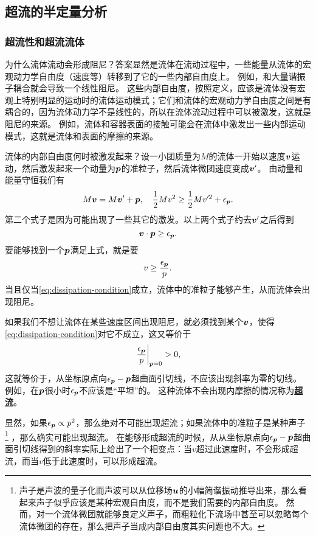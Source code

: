 \documentclass[hyperref, UTF8, a4paper]{ctexart}
\newcommand{\concept}[1]{\underline{\textbf{#1}}}
\begin{document}
\subsection{超流的半定量分析}

\subsubsection{超流性和超流流体}

为什么流体流动会形成阻尼？答案显然是流体在流动过程中，一些能量从流体的宏观动力学自由度（速度等）转移到了它的一些内部自由度上。
例如，和大量谐振子耦合就会导致一个线性阻尼。
这些内部自由度，按照定义，应该是流体没有宏观上特别明显的运动时的流体运动模式；它们和流体的宏观动力学自由度之间是有耦合的，因为流体动力学不是线性的，所以在流体流动过程中可以被激发，这就是阻尼的来源。
例如，流体和容器表面的接触可能会在流体中激发出一些内部运动模式，这就是流体和表面的摩擦的来源。

流体的内部自由度何时被激发起来？设一小团质量为$M$的流体一开始以速度$\vb*{v}$运动，然后激发起来一个动量为$\vb*{p}$的准粒子，然后流体微团速度变成$\vb*{v}'$。
由动量和能量守恒我们有
\[
    M \vb*{v} = M \vb*{v}' + \vb*{p}, \quad \frac{1}{2} M v^2 \geq \frac{1}{2} M v'^2 + \epsilon_{\vb*{p}}.
\]
第二个式子是因为可能出现了一些其它的激发。以上两个式子约去$\vb*{v}'$之后得到
\[
    \vb*{v} \cdot \vb*{p} \geq \epsilon_{\vb*{p}}.
\]
要能够找到一个$\vb*{p}$满足上式，就是要
\begin{equation}
    v \geq \frac{\epsilon_{\vb*{p}}}{p}.
    \label{eq:dissipation-condition}
\end{equation}
当且仅当\eqref{eq:dissipation-condition}成立，流体中的准粒子能够产生，从而流体会出现阻尼。

如果我们不想让流体在某些速度区间出现阻尼，就必须找到某个$\vb*{v}$，使得\eqref{eq:dissipation-condition}对它不成立，这又等价于
\[
    \eval{\frac{\epsilon_{\vb*{p}}}{p}}_{\vb*{p}=0} > 0,
\]
这就等价于，从坐标原点向$\epsilon_{\vb*{p}}-\vb*{p}$超曲面引切线，不应该出现斜率为零的切线。
例如，在$\vb*{p}$很小时$\epsilon_{\vb*{p}}$不应该是“平坦”的。
这种流体不会出现内摩擦的情况称为\concept{超流}。

显然，如果$\epsilon_{\vb*{p}} \propto p^2$，那么绝对不可能出现超流；如果流体中的准粒子是某种声子%
\footnote{声子是声波的量子化而声波可以从位移场$\vb*{u}$的小幅简谐振动推导出来，那么看起来声子似乎应该是某种宏观自由度，而不是我们需要的内部自由度。
然而，对一个流体微团就能够良定义声子，而粗粒化下流场中甚至可以忽略每个流体微团的存在，那么把声子当成内部自由度其实问题也不大。}%
，那么确实可能出现超流。
在能够形成超流的时候，从从坐标原点向$\epsilon_{\vb*{p}}-\vb*{p}$超曲面引切线得到的斜率实际上给出了一个相变点：当$v$超过此速度时，不会形成超流，而当$v$低于此速度时，可以形成超流。
\end{document}
